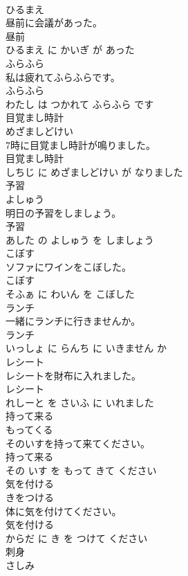 \documentclass[8pt]{extreport}
\begin{document}
\begin{CJK}{UTF8}{min}
\\	ひるまえ			
\\	昼前に会議があった。	
\\	昼前 
\\	ひるまえ に かいぎ が あった			
\\	ふらふら	
\\	私は疲れてふらふらです。	
\\	ふらふら 
\\	わたし は つかれて ふらふら です			
\\	目覚まし時計	
\\	めざましどけい			
\\	7時に目覚まし時計が鳴りました。	
\\	目覚まし時計 
\\	しちじ に めざましどけい が なりました			
\\	予習	
\\	よしゅう			
\\	明日の予習をしましょう。	
\\	予習 
\\	あした の よしゅう を しましょう			
\\	こぼす	
\\	ソファにワインをこぼした。	
\\	こぼす 
\\	そふぁ に わいん を こぼした			
\\	ランチ	
\\	一緒にランチに行きませんか。	
\\	ランチ 
\\	いっしょ に らんち に いきません か			
\\	レシート	
\\	レシートを財布に入れました。	
\\	レシート 
\\	れしーと を さいふ に いれました			
\\	持って来る	
\\	もってくる			
\\	そのいすを持って来てください。	
\\	持って来る 
\\	その いす を もって きて ください			
\\	気を付ける	
\\	きをつける			
\\	体に気を付けてください。	
\\	気を付ける 
\\	からだ に き を つけて ください			
\\	刺身	
\\	さしみ			

\end{CJK}
\end{document}
